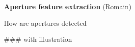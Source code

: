\textbf{Aperture feature extraction} (Romain)

 How are apertures detected
 
### with illustration
    
